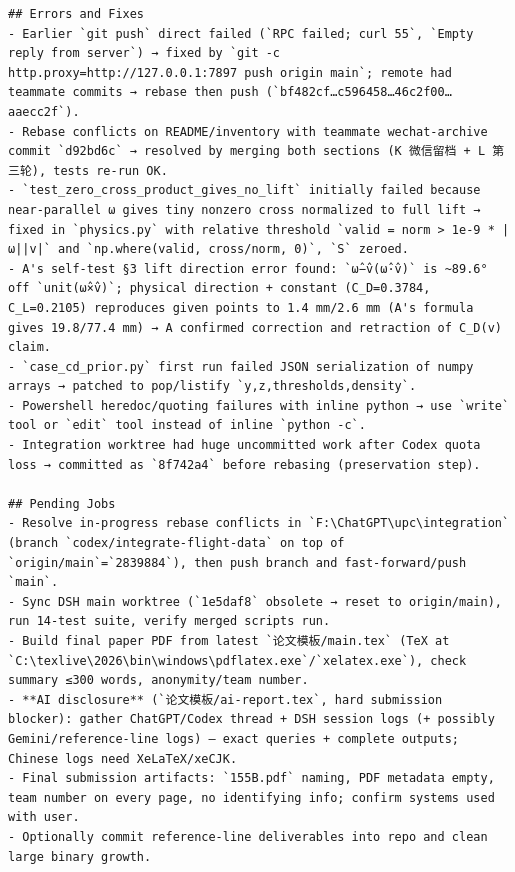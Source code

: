 \documentclass[UTF8,10pt]{ctexart}
\begin{document}
\begin{Verbatim}[breaklines=true,breakanywhere=true,fontsize=\scriptsize,frame=single,framesep=2pt]
## Errors and Fixes
- Earlier `git push` direct failed (`RPC failed; curl 55`, `Empty reply from server`) → fixed by `git -c http.proxy=http://127.0.0.1:7897 push origin main`; remote had teammate commits → rebase then push (`bf482cf…c596458…46c2f00…aaecc2f`).
- Rebase conflicts on README/inventory with teammate wechat-archive commit `d92bd6c` → resolved by merging both sections (K 微信留档 + L 第三轮), tests re-run OK.
- `test_zero_cross_product_gives_no_lift` initially failed because near-parallel ω gives tiny nonzero cross normalized to full lift → fixed in `physics.py` with relative threshold `valid = norm > 1e-9 * |ω||v|` and `np.where(valid, cross/norm, 0)`, `S` zeroed.
- A's self-test §3 lift direction error found: `ω̂−v̂(ω̂·v̂)` is ~89.6° off `unit(ω̂×v̂)`; physical direction + constant (C_D=0.3784, C_L=0.2105) reproduces given points to 1.4 mm/2.6 mm (A's formula gives 19.8/77.4 mm) → A confirmed correction and retraction of C_D(v) claim.
- `case_cd_prior.py` first run failed JSON serialization of numpy arrays → patched to pop/listify `y,z,thresholds,density`.
- Powershell heredoc/quoting failures with inline python → use `write` tool or `edit` tool instead of inline `python -c`.
- Integration worktree had huge uncommitted work after Codex quota loss → committed as `8f742a4` before rebasing (preservation step).

## Pending Jobs
- Resolve in-progress rebase conflicts in `F:\ChatGPT\upc\integration` (branch `codex/integrate-flight-data` on top of `origin/main`=`2839884`), then push branch and fast-forward/push `main`.
- Sync DSH main worktree (`1e5daf8` obsolete → reset to origin/main), run 14-test suite, verify merged scripts run.
- Build final paper PDF from latest `论文模板/main.tex` (TeX at `C:\texlive\2026\bin\windows\pdflatex.exe`/`xelatex.exe`), check summary ≤300 words, anonymity/team number.
- **AI disclosure** (`论文模板/ai-report.tex`, hard submission blocker): gather ChatGPT/Codex thread + DSH session logs (+ possibly Gemini/reference-line logs) — exact queries + complete outputs; Chinese logs need XeLaTeX/xeCJK.
- Final submission artifacts: `155B.pdf` naming, PDF metadata empty, team number on every page, no identifying info; confirm systems used with user.
- Optionally commit reference-line deliverables into repo and clean large binary growth.


\end{Verbatim}
\end{document}
